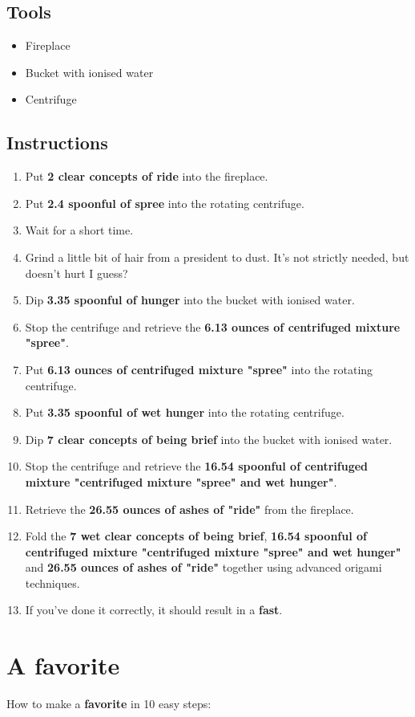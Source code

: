 \documentclass{article}
\begin{document}
\subsection{Tools}\begin{itemize}
\item 
Fireplace
\item 
Bucket with ionised water
\item 
Centrifuge
\end{itemize}
\subsection{Instructions}\begin{enumerate}
\item 
Put \textbf{2 clear concepts of ride} into the fireplace.
\item 
Put \textbf{2.4 spoonful of spree} into the rotating centrifuge.
\item 
Wait for a short time.
\item 
Grind a little bit of hair from a president to dust. It's not strictly needed, but doesn't hurt I guess?
\item 
Dip \textbf{3.35 spoonful of hunger} into the bucket with ionised water.
\item 
Stop the centrifuge and retrieve the \textbf{6.13 ounces of centrifuged mixture "spree"}.
\item 
Put \textbf{6.13 ounces of centrifuged mixture "spree"} into the rotating centrifuge.
\item 
Put \textbf{3.35 spoonful of wet hunger} into the rotating centrifuge.
\item 
Dip \textbf{7 clear concepts of being brief} into the bucket with ionised water.
\item 
Stop the centrifuge and retrieve the \textbf{16.54 spoonful of centrifuged mixture "centrifuged mixture "spree" and wet hunger"}.
\item 
Retrieve the \textbf{26.55 ounces of ashes of "ride"} from the fireplace.
\item 
Fold the \textbf{7 wet clear concepts of being brief}, \textbf{16.54 spoonful of centrifuged mixture "centrifuged mixture "spree" and wet hunger"} and \textbf{26.55 ounces of ashes of "ride"} together using advanced origami techniques.
\item 
If you've done it correctly, it should result in a \textbf{fast}.
\end{enumerate}
\newpage
\section{A favorite}How to make a \textbf{favorite} in 10 easy steps:
\end{document}
